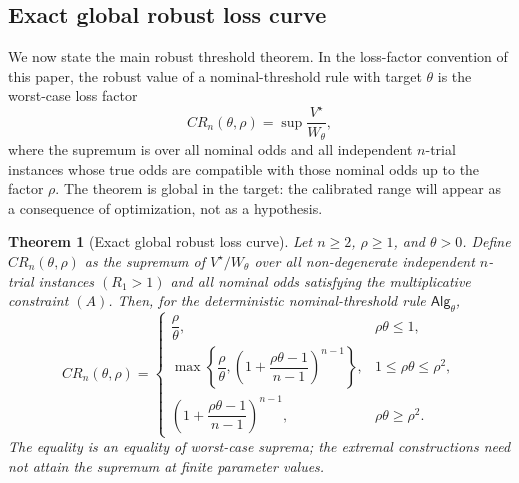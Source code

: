 \documentclass[11pt,a4paper]{article}
\newtheorem{theorem}{Theorem}
\newcommand{\alg}{\mathsf{Alg}}
\begin{document}
\subsection{Exact global robust loss curve}
\label{subsec:global-smoothness-curve}

We now state the main robust threshold theorem.  In the loss-factor convention
of this paper, the robust value of a nominal-threshold rule with target
\(\theta\) is the worst-case loss factor
\[
  CR_n(\theta,\rho)
  =
  \sup
  \frac{V^\star}{W_\theta},
\]
where the supremum is over all nominal odds and all independent \(n\)-trial
instances whose true odds are compatible with those nominal odds up to the factor
\(\rho\).  The theorem is global in the target: the calibrated range will appear
as a consequence of optimization, not as a hypothesis.

\begin{theorem}[Exact global robust loss curve]
\label{thm:global-threshold-smoothness}
Let \(n\ge2\), \(\rho\ge1\), and \(\theta>0\).  Define \(CR_n(\theta,\rho)\) as
the supremum of \(V^\star/W_\theta\) over all non-degenerate independent
\(n\)-trial instances \((R_1>1)\) and all nominal odds satisfying the
multiplicative constraint \((A)\).  Then, for the deterministic
nominal-threshold rule \(\alg_\theta\),
\[
  CR_n(\theta,\rho)
  =
  \begin{cases}
    \dfrac{\rho}{\theta},
    & \rho\theta\le1,\\[0.8em]
    \displaystyle
    \max\left\{
      \dfrac{\rho}{\theta},
      \left(1+\dfrac{\rho\theta-1}{n-1}\right)^{n-1}
    \right\},
    & 1\le \rho\theta\le\rho^2,\\[1em]
    \displaystyle
    \left(1+\dfrac{\rho\theta-1}{n-1}\right)^{n-1},
    & \rho\theta\ge\rho^2.
  \end{cases}
\]
The equality is an equality of worst-case suprema; the extremal constructions
need not attain the supremum at finite parameter values.
\end{theorem}
\end{document}

